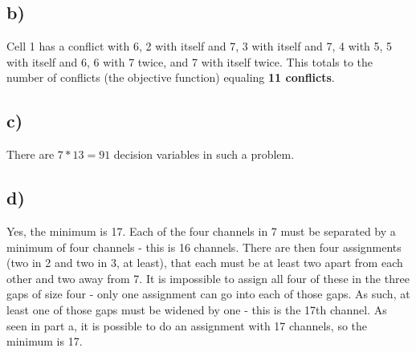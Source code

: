 \documentclass[12pt]{article}
\begin{document}
\subsection{b)}
Cell 1 has a conflict with 6, 2 with itself and 7, 3 with itself and 7, 4 with 5, 5 with itself and 6, 6 with 7 twice, and 7 with itself twice. This totals to the number of conflicts (the objective function) equaling \textbf{11 conflicts}.

\subsection{c)}
There are $7 * 13 = 91$ decision variables in such a problem.

\subsection{d)}
Yes, the minimum is 17. Each of the four channels in 7 must be separated by a minimum of four channels - this is 16 channels. There are then four assignments (two in 2 and two in 3, at least), that each must be at least two apart from  each other and two away from 7. It is impossible to assign all four of these in the three gaps of size four - only one assignment can go into each of those gaps. As such, at least one of those gaps must be widened by one - this is the 17th channel. As seen in part a, it is possible to do an assignment with 17 channels, so the minimum is 17.
\end{document}
